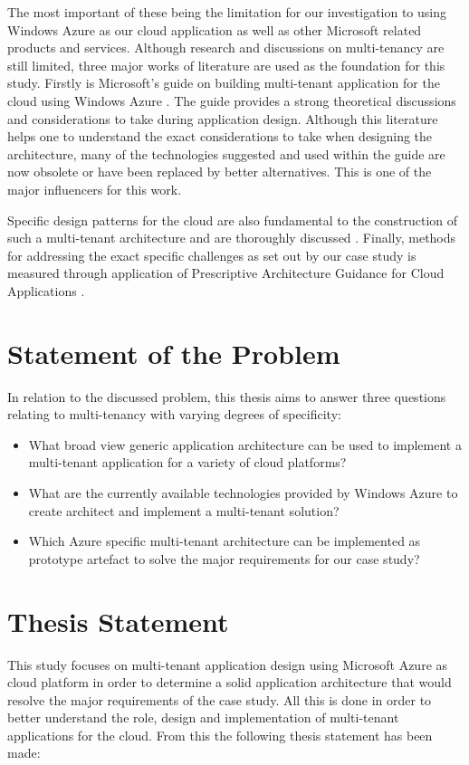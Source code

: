 The most important of these being the limitation for our investigation to using Windows Azure as our cloud application as well as other Microsoft related products and services. Although research and discussions on multi-tenancy are still limited, three major works of literature are used as the foundation for this study. Firstly is Microsoft's guide on building multi-tenant application for the cloud using Windows Azure \cite{Betts2012-ad}. The guide provides a strong theoretical discussions and considerations to take during application design. Although this literature helps one to understand the exact considerations to take when designing the architecture, many of the technologies suggested and used within the guide are now obsolete or have been replaced by better alternatives. This is one of the major influencers for this work.

Specific design patterns for the cloud are also fundamental to the construction of such a multi-tenant architecture and are thoroughly discussed \cite{Wilder2012-so}. Finally, methods for addressing the exact specific challenges as set out by our case study is measured through application of Prescriptive Architecture Guidance for Cloud Applications \cite{Homer2014-oa}.

\section{Statement of the Problem}
In relation to the discussed problem, this thesis aims to answer three questions relating to multi-tenancy with varying degrees of specificity:
\begin{itemize}
\item What broad view generic application architecture can be used to implement a multi-tenant application for a variety of cloud platforms?
\item What are the currently available technologies provided by Windows Azure to create architect and implement a multi-tenant solution?
\item Which Azure specific multi-tenant architecture can be implemented as prototype artefact to solve the major requirements for our case study?
\end{itemize}

\section{Thesis Statement}
This study focuses on multi-tenant application design using Microsoft Azure as cloud platform in order to determine a solid application architecture that would resolve the major requirements of the case study. All this is done in order to better understand the role, design and implementation of multi-tenant applications for the cloud. From this the following thesis statement has been made:
 
